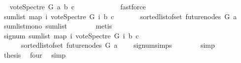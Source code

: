 \begin{isabellebody}
\ \isamarkupfalse%
\ {\isachardoublequoteopen}vote{\isacharunderscore}{\kern0pt}Spectre\ G\ a{}\ b\ c\ \ {\isasymge}\ {}{\isachardoublequoteclose}\isanewline
\ \ \ \ \ \ \ \ \isamarkupfalse%
\ fastforce\isanewline
\ \ \ \ \isamarkupfalse%
\ \isanewline
\ \ \ \ \isamarkupfalse%
\ \isamarkupfalse%
\ {\isachardoublequoteopen}{\isacharparenleft}{\kern0pt}sum{\isacharunderscore}{\kern0pt}list\ {\isacharparenleft}{\kern0pt}map\ {\isacharparenleft}{\kern0pt}{\isasymlambda}i{\isachardot}{\kern0pt}\ vote{\isacharunderscore}{\kern0pt}Spectre\ G\ i\ b\ c{\isacharparenright}{\kern0pt}\ \isanewline
\ \ \ \ \ \ {\isacharparenleft}{\kern0pt}sorted{\isacharunderscore}{\kern0pt}list{\isacharunderscore}{\kern0pt}of{\isacharunderscore}{\kern0pt}set\ {\isacharparenleft}{\kern0pt}future{\isacharunderscore}{\kern0pt}nodes\ G\ a{\isacharparenright}{\kern0pt}{\isacharparenright}{\kern0pt}{\isacharparenright}{\kern0pt}{\isacharparenright}{\kern0pt}\ {\isasymge}\ {}{\isachardoublequoteclose}\ \isamarkupfalse%
\ sum{\isacharunderscore}{\kern0pt}list{\isacharunderscore}{\kern0pt}mono\ sum{\isacharunderscore}{\kern0pt}list{\isacharunderscore}{\kern0pt}{}\isanewline
\ \ \ \ \ \ \isamarkupfalse%
\ metis\ \isanewline
\ \ \ \ \isamarkupfalse%
\ \isamarkupfalse%
\ {\isachardoublequoteopen}signum\ {\isacharparenleft}{\kern0pt}sum{\isacharunderscore}{\kern0pt}list\ {\isacharparenleft}{\kern0pt}map\ {\isacharparenleft}{\kern0pt}{\isasymlambda}i{\isachardot}{\kern0pt}\ vote{\isacharunderscore}{\kern0pt}Spectre\ G\ i\ b\ c{\isacharparenright}{\kern0pt}\ \isanewline
\ \ \ \ \ \ {\isacharparenleft}{\kern0pt}sorted{\isacharunderscore}{\kern0pt}list{\isacharunderscore}{\kern0pt}of{\isacharunderscore}{\kern0pt}set\ {\isacharparenleft}{\kern0pt}future{\isacharunderscore}{\kern0pt}nodes\ G\ a{\isacharparenright}{\kern0pt}{\isacharparenright}{\kern0pt}{\isacharparenright}{\kern0pt}{\isacharparenright}{\kern0pt}\ {\isasymin}\ {\isacharbraceleft}{\kern0pt}{}{\isacharcomma}{\kern0pt}{}{\isacharbraceright}{\kern0pt}{\isachardoublequoteclose}\ \isamarkupfalse%
\ signum{\isachardot}{\kern0pt}simps\isanewline
\ \ \ \ \ \ \isamarkupfalse%
\ simp\ \isanewline
\ \ \ \ \isamarkupfalse%
\ \isamarkupfalse%
\ {\isacharquery}{\kern0pt}thesis\ \isamarkupfalse%
\ four\ \isamarkupfalse%
\ simp\ \isanewline

\end{isabellebody}
